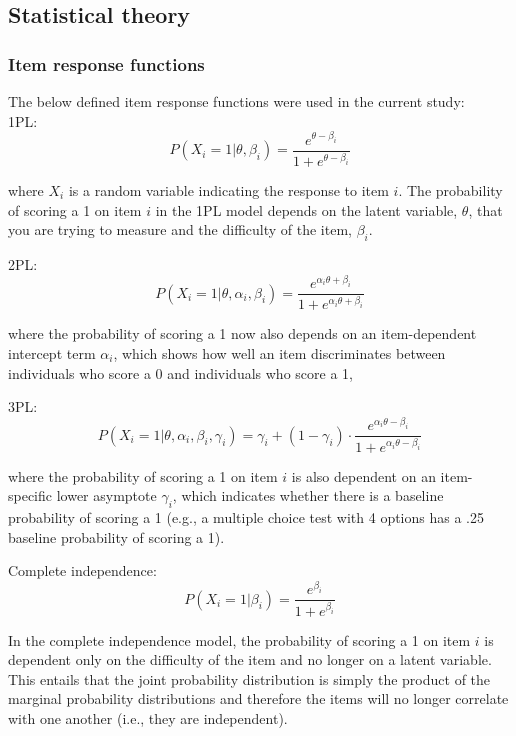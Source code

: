\documentclass[Royal,sageapa,times, doublespace]{sagej}
\begin{document}
\subsection{Statistical theory}
\subsubsection{Item response functions}
The below defined item response functions were used in the current study: \\
1PL:
\begin{equation}
P(X_i = 1 | \theta, \beta_{i}) = \frac{e^{\theta - \beta_{i}}}{1 + e^{\theta - \beta_{i}}}
\end{equation}

where $X_i$ is a random variable indicating the response to item $i$. The probability of scoring a 1 on item $i$ in the 1PL model depends on the latent
variable, $\theta$, that you are trying to measure and the difficulty of the item, $\beta_i$.

2PL:
\begin{equation}
P(X_i = 1 | \theta, \alpha_{i}, \beta_{i}) = \frac{e^{\alpha_{i}\theta + \beta_{i}}}{1 + e^{\alpha_{i}\theta + \beta_{i}}}
\end{equation}

where the probability of scoring a 1 now also depends on an item-dependent intercept term $\alpha_i$, which shows how well an item discriminates
between individuals who score a 0 and individuals who score a 1,

3PL:
\begin{equation}
P(X_i = 1 | \theta, \alpha_{i}, \beta_{i}, \gamma_{i}) = \gamma_{i} + (1 - \gamma_{i}) \cdot 
\frac{e^{\alpha_{i}\theta - \beta_{i}}}{1 + e^{\alpha_{i}\theta - \beta_{i}}}
\end{equation}

where the probability of scoring a 1 on item $i$ is also dependent on an item-specific lower asymptote $\gamma_i$, which indicates whether there is
a baseline probability of scoring a 1 (e.g., a multiple choice test with 4 options has a .25 baseline probability of scoring a 1).

Complete independence:
\begin{equation}
P(X_i = 1 | \beta_{i}) = \frac{e^{\beta_{i}}}{1 + e^{\beta_{i}}}
\end{equation}

In the complete independence model, the probability of scoring a 1 on item $i$ is dependent only on the difficulty of the item and no longer on
a latent variable. This entails that the joint probability distribution is simply the product of the marginal probability distributions and therefore the
items will no longer correlate with one another (i.e., they are independent).
\end{document}
